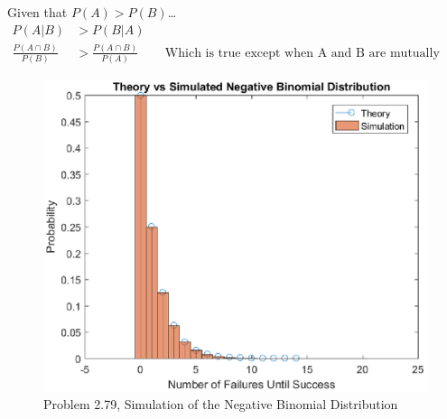 \documentclass[12pt]{article}
\newenvironment{problem}[2][Problem]{\begin{trivlist}
\item[\hskip \labelsep {\bfseries #1}\hskip \labelsep {\bfseries #2.}]
  \vspace{1 cm}
}{\end{trivlist}}
\begin{document}
\begin{problem}{2.27}
\item Given that $P(A) > P(B)$\dots%
  \begin{align*}
    P(A|B) &> P(B|A) \\
    \frac{P(A\cap B)}{P(B)} &> \frac{P(A\cap B)}{P(A)} & & \textrm{Which is true except when A and B are mutually exculsive}
  \end{align*}%
\end{problem}

\begin{problem}{2.77}
\item%
\end{problem}

\newpage

\begin{problem}{2.79}
\item%
  \begin{figure}[htpb]
    \centering
    \includegraphics[scale=1]{fig_2_79.eps}
    \caption{Problem 2.79, Simulation of the Negative Binomial Distribution}
  \end{figure}%
\end{problem}
\end{document}
